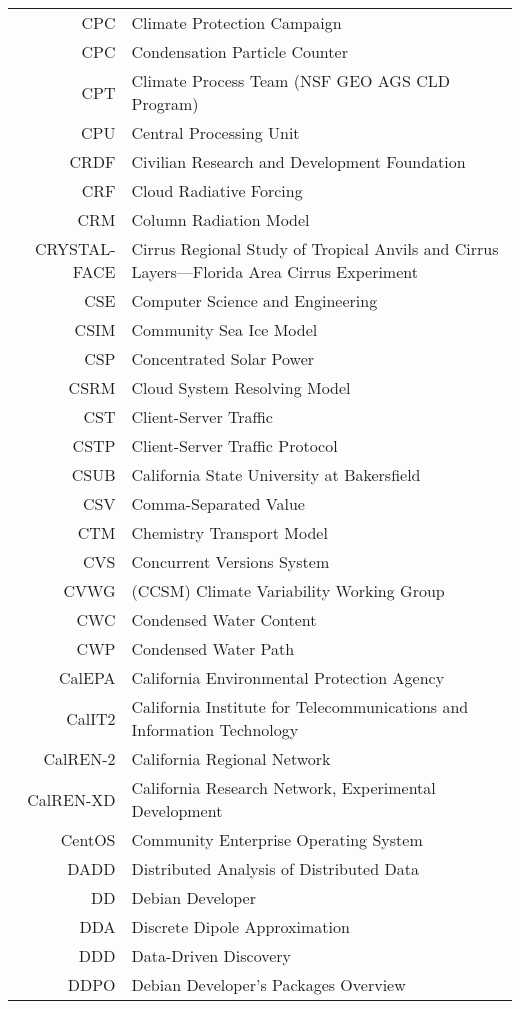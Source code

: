 \documentclass[12pt,twoside]{article}
\begin{document}
\begin{longtable}[>{\bfseries}l]{>{\ttfamily}r l}
CPC & Climate Protection Campaign \\
CPC & Condensation Particle Counter \\ 
CPT & Climate Process Team (NSF GEO AGS CLD Program) \\
CPU & Central Processing Unit \\
CRDF & Civilian Research and Development Foundation \\
CRF & Cloud Radiative Forcing \\
CRM & Column Radiation Model \\
CRYSTAL-FACE & Cirrus Regional Study of Tropical Anvils and Cirrus Layers---Florida Area Cirrus Experiment \\
CSE & Computer Science and Engineering \\
CSIM & Community Sea Ice Model \\
CSP & Concentrated Solar Power \\
CSRM & Cloud System Resolving Model \\
CST & Client-Server Traffic \\
CSTP & Client-Server Traffic Protocol \\
CSUB & California State University at Bakersfield \\
CSV & Comma-Separated Value \\
CTM & Chemistry Transport Model \\
CVS & Concurrent Versions System \\
CVWG & (CCSM) Climate Variability Working Group \\
CWC & Condensed Water Content \\
CWP & Condensed Water Path \\
CalEPA & California Environmental Protection Agency \\
CalIT2 & California Institute for Telecommunications and Information Technology \\
CalREN-2 & California Regional Network \\
CalREN-XD & California Research Network, Experimental Development \\
CentOS & Community Enterprise Operating System \\
DADD & Distributed Analysis of Distributed Data \\
DD & Debian Developer \\
DDA & Discrete Dipole Approximation \\
DDD & Data-Driven Discovery \\
DDPO & Debian Developer's Packages Overview \\

\end{longtable}
\end{document}

